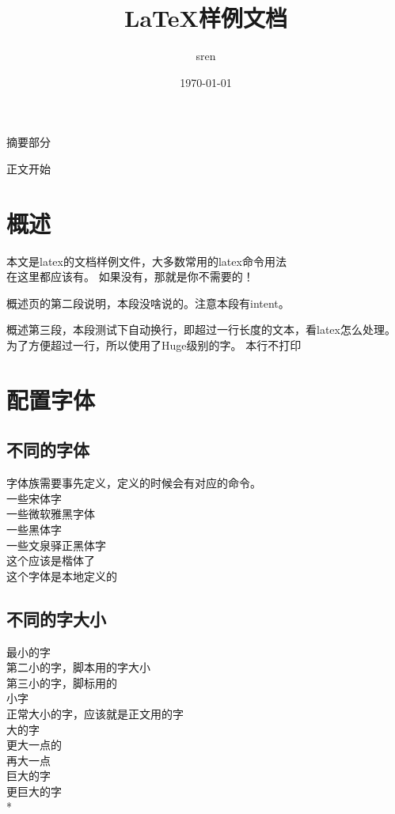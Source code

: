 \documentclass[a4paper,12pt]{article} %
\title{LaTeX样例文档}
\author{sren}
\date{\today}
\begin{document}
\maketitle
\thispagestyle{empty} %


\newpage
{}
摘要部分


\newpage
\tableofcontents
\newpage
\listoffigures
\newpage
\listoftables

\newpage %
正文开始
 \section{概述}
 本文是latex的文档样例文件，大多数常用的latex命令用法\\在这里都应该有。
 如果没有，那就是你不需要的！

 概述页的第二段说明，本段没啥说的。注意本段有intent。

 {\Huge 概述第三段，本段测试下自动换行，即超过一行长度的文本，看latex怎么处理。为了方便超过一行，所以使用了Huge级别的字。}
 {\kill 本行不打印}
 \pagebreak

 
 \section[pz字体]{配置字体} %
 \subsection{不同的字体}
 字体族需要事先定义，定义的时候会有对应的命令。\\
 {\song 一些宋体字}\\ %
 {\yahei 一些微软雅黑字体}\\
 {\hei 一些黑体字}\\
 {\zhei 一些文泉驿正黑体字}\\
 {\kai 这个应该是楷体了}\\
 { 这个字体是本地定义的}

 \subsection*{不同的字大小} %
 {\tiny 最小的字 }\\
 {\scriptsize 第二小的字，脚本用的字大小}\\
 {\footnotesize 第三小的字，脚标用的}\\
 {\small 小字}\\
 {\normalsize 正常大小的字，应该就是正文用的字 }\\
 {\large 大的字 }\\
 {\Large 更大一点的}\\
 {\LARGE 再大一点}\\
 {\huge 巨大的字}\\
 {\Huge 更巨大的字}\\* %
\end{document}
